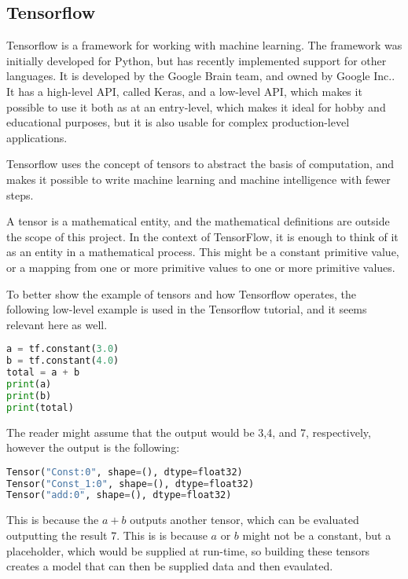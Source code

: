 \subsection{Tensorflow}
Tensorflow is a framework for working with machine learning\cite{tensorflow2015-whitepaper}.
The framework was initially developed for Python, but has recently implemented support for other languages.
It is developed by the Google Brain team, and owned by Google Inc.\cite{tensorflow-attribution}.
It has a high-level API, called Keras, and a low-level API, which makes it possible to use it both as at an entry-level, which makes it ideal for hobby and educational purposes, but it is also usable for complex production-level applications.

Tensorflow uses the concept of tensors to abstract the basis of computation, and makes it possible to write machine learning and machine intelligence with fewer steps.

A tensor is a mathematical entity, and the mathematical definitions are outside the scope of this project.
In the context of TensorFlow, it is enough to think of it as an entity in a mathematical process.
This might be a constant primitive value, or a mapping from one or more primitive values to one or more primitive values.

To better show the example of tensors and how Tensorflow operates, the following low-level example is used in the Tensorflow tutorial, and it seems relevant here as well.

\begin{lstlisting}[language=Python,label=lis:TensorFlowPy1,caption=Example of a Tensorflow program]
a = tf.constant(3.0)
b = tf.constant(4.0)
total = a + b
print(a)
print(b)
print(total)
\end{lstlisting}
The reader might assume that the output would be 3,4, and 7, respectively, however the output is the following:
\begin{lstlisting}[language=Python,label=lis:TensorFlowPy2,caption=Output of example \ref{lis:TensorFlowPy2}]
Tensor("Const:0", shape=(), dtype=float32)
Tensor("Const_1:0", shape=(), dtype=float32)
Tensor("add:0", shape=(), dtype=float32)
\end{lstlisting}
This is because the $ a + b $ outputs another tensor, which can be evaluated outputting the result 7.
This is is because $a$ or $b$ might not be a constant, but a placeholder, which would be supplied at run-time, so building these tensors creates a model that can then be supplied data and then evaulated.

